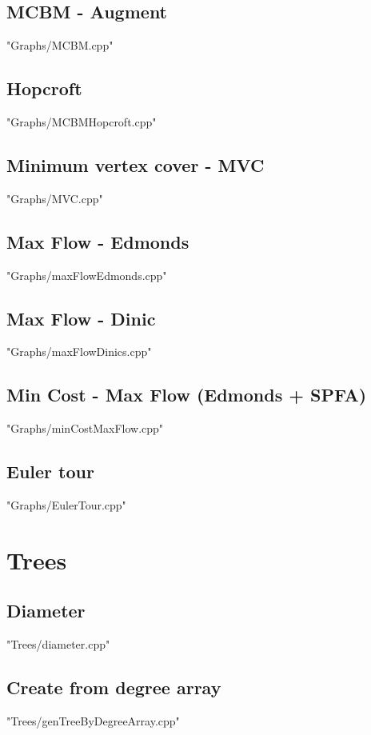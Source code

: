 \documentclass [12pt,twocolumn,oneside]{article}
\begin{document}
\subsection{ MCBM - Augment}
 {"Graphs/MCBM.cpp"}

\subsection{ Hopcroft}
 {"Graphs/MCBMHopcroft.cpp"}

\subsection{ Minimum vertex cover - MVC}
 {"Graphs/MVC.cpp"}

\subsection{ Max Flow - Edmonds}
 {"Graphs/maxFlowEdmonds.cpp"}

\subsection{ Max Flow - Dinic}
 {"Graphs/maxFlowDinics.cpp"}

\subsection{ Min Cost - Max Flow (Edmonds + SPFA)}
 {"Graphs/minCostMaxFlow.cpp"}

\subsection{ Euler tour}
 {"Graphs/EulerTour.cpp"}


\newpage
\section{Trees}

\subsection{ Diameter}
 {"Trees/diameter.cpp"}

\subsection{ Create from degree array}
 {"Trees/genTreeByDegreeArray.cpp"}
\end{document}
